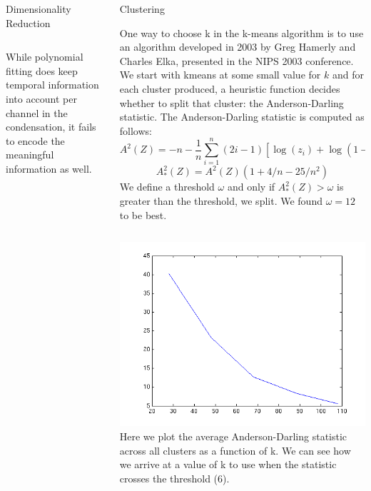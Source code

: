 \documentclass[final,t]{beamer}
\begin{document}
\begin{frame}{}
\begin{columns}[t]
\begin{column}{.3\linewidth}
\begin{block}{Dimensionality Reduction}
\begin{columns}[c]
     \end{columns}
     While polynomial fitting \alert{does keep temporal information} into
     account per channel in the condensation, it \alert{fails to encode the
     meaningful information as well}.

     \end{block}
   \end{column}
   
    
    \begin{column}{.3\linewidth}
      \begin{block}{Clustering}
        \par
        One way to choose k in the k-means algorithm is to use an algorithm
developed in 2003 by Greg Hamerly and Charles Elka, presented in the NIPS
2003 conference. We start with kmeans at some small value for $k$ and for each cluster produced, a
heuristic function decides whether to split that cluster: the
Anderson-Darling statistic. The Anderson-Darling statistic is computed as follows:
$$
A^2(Z) = -n - \frac{1}{n}\sum_{i=1}^n (2i -
1)[\log(z_i)+\log(1-z_{n+1-i})]
$$$$
A^2_*(Z) = A^2(Z)(1 + 4/n - 25/n^2)
$$
We define a threshold $\omega$ and only if $A^2_*(Z)  > \omega$ is
greater than the threshold, we split. We found $\omega = 12$ to be best.
\vskip2cm
       \begin{columns}[c,l]
\includegraphics[width=1.0\linewidth]{images/gmeans_k_vs_metric.png} 
Here we plot the average Anderson-Darling statistic across all
clusters as a function of k. We can see how we arrive at a value of k
to use when the statistic crosses the threshold (6).
       \end{columns} 


\end{block}
\end{column}
\end{columns}
\end{frame}
\end{document}
